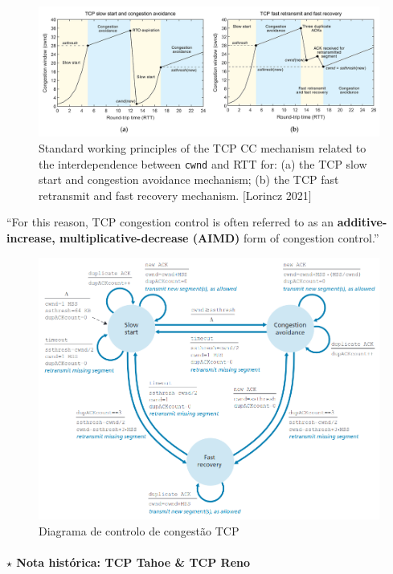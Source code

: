 \begin{figure}[H]
    \centering
    \includegraphics[width = 0.9\linewidth]{img/3/congestion-graphic.png}
    \caption{Standard working principles of the TCP CC mechanism related to the interdependence between \texttt{cwnd} and RTT for: (a) the TCP slow start and congestion avoidance mechanism; (b) the TCP fast retransmit and fast recovery mechanism. $[$Lorincz 2021$]$}
    \label{fig:congestion-graphic}
\end{figure}

\noindent ``For this reason, TCP congestion control is often referred to as an \textbf{additive-increase, multiplicative-decrease (AIMD)} form of congestion control.''\cite{Kurose2017}

\begin{figure}[H]
    \centering
    \includegraphics[width = 1\linewidth]{img/3/congestion-control-diagram.png}
    \caption{Diagrama de controlo de congestão TCP \cite{Kurose2017}}
    \label{fig:congestion-control-diagram}
\end{figure}

\paragraph[3.6.3.1 Nota histórica: TCP Tahoe \& TCP Reno]{$\pmb{\star}$ Nota histórica: TCP Tahoe \& TCP Reno}\mbox{}

